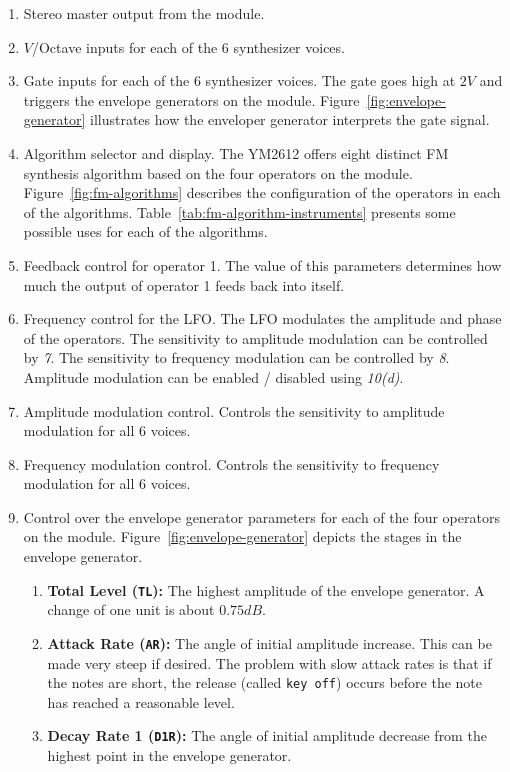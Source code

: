\documentclass[12pt,a4paper]{article}
\begin{document}
\clearpage
\begin{enumerate}
  \item Stereo master output from the module.
  \item $V$/Octave inputs for each of the 6 synthesizer voices.
  \item Gate inputs for each of the 6 synthesizer voices. The gate goes high at $2V$ and triggers the envelope generators on the module. Figure~\ref{fig:envelope-generator} illustrates how the enveloper generator interprets the gate signal.
  \item Algorithm selector and display. The YM2612 offers eight distinct FM synthesis algorithm based on the four operators on the module. Figure~\ref{fig:fm-algorithms} describes the configuration of the operators in each of the algorithms. Table~\ref{tab:fm-algorithm-instruments} presents some possible uses for each of the algorithms.
  \item Feedback control for operator 1. The value of this parameters determines how much the output of operator 1 feeds back into itself.
  \item Frequency control for the LFO. The LFO modulates the amplitude and phase of the operators. The sensitivity to amplitude modulation can be controlled by \textit{7}. The sensitivity to frequency modulation can be controlled by \textit{8}. Amplitude modulation can be enabled / disabled using \textit{10(d)}.
  \item Amplitude modulation control. Controls the sensitivity to amplitude modulation for all 6 voices.
  \item Frequency modulation control. Controls the sensitivity to frequency modulation for all 6 voices.
  \item Control over the envelope generator parameters for each of the four operators on the module. Figure~\ref{fig:envelope-generator} depicts the stages in the envelope generator. \begin{enumerate}
    \item \textbf{Total Level (\texttt{TL}):} The highest amplitude of the envelope generator. A change of one unit is about $0.75dB$.
    \item \textbf{Attack Rate (\texttt{AR}):} The angle of initial amplitude increase. This can be made very steep if desired. The problem with slow attack rates is that if the notes are short, the release (called \texttt{key off}) occurs before the note has reached a reasonable level.
    \item \textbf{Decay Rate 1 (\texttt{D1R}):} The angle of initial amplitude decrease from the highest point in the envelope generator.

\end{enumerate}
\end{enumerate}
\end{document}
